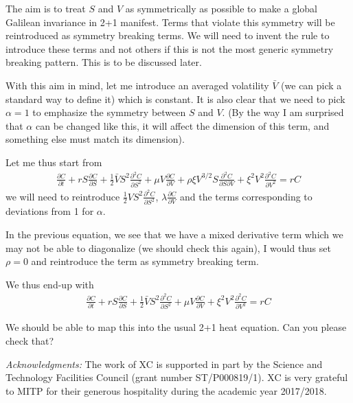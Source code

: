 \documentclass[english,12pt]{article}
\begin{document}
The aim is to treat $S$ and $V$ as symmetrically as possible to make a global Galilean invariance in 2+1 manifest. Terms that violate this symmetry will be reintroduced as symmetry breaking terms. We will need to invent the rule to introduce these terms and not others if this is not the most generic symmetry breaking pattern. This is to be discussed later.

With this aim in mind, let me introduce an averaged volatility $\bar V$ (we can pick a standard way to define it) which is constant.  It is also clear that we need to pick $\alpha=1$  to emphasize the symmetry between $S$ and $V$. (By the way I am surprised that $\alpha$ can be changed like this, it will affect the dimension of this term, and something else must match its dimension).

Let me thus start from 
\begin{eqnarray}
\frac{\partial C}{\partial t}+ r S \frac{\partial C}{\partial S} + \frac{1}{2} \bar V S^2 \frac{\partial^2 C}{\partial S^2} +\mu V \frac{\partial C}{\partial V} +\rho \xi V^{3/2} S \frac{\partial^2 C}{\partial S \partial V} +\xi^2 V^{2}  \frac{\partial^2 C}{\partial V^2}= r C
\end{eqnarray}
we will need to reintroduce $\frac{1}{2} V S^2 \frac{\partial^2 C}{\partial S^2}$,  $\lambda \frac{\partial C}{\partial V} $ and the terms corresponding to deviations from 1 for $\alpha$.

In the previous equation, we see that we have a mixed derivative term which we may not be able to diagonalize (we should check this again), I would thus set $\rho=0$ and reintroduce the term as symmetry breaking term. 

We thus end-up with
\begin{eqnarray}
\frac{\partial C}{\partial t}+ r S \frac{\partial C}{\partial S} + \frac{1}{2} \bar V S^2 \frac{\partial^2 C}{\partial S^2} +\mu V \frac{\partial C}{\partial V} +\xi^2 V^{2}  \frac{\partial^2 C}{\partial V^2}= r C
\end{eqnarray}

We should be able to map this into the usual 2+1 heat equation. Can you please check that?


{\it Acknowledgments:}
The work of XC is supported in part  by the Science and Technology Facilities Council (grant number  ST/P000819/1). XC is very grateful to MITP for their generous hospitality during the academic year 2017/2018. 



\bigskip{}


\baselineskip=1.6pt 

\begin{thebibliography}{10}

   
\end{thebibliography}
\end{document}
